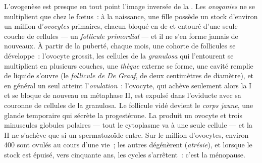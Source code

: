 \begin{definition}\label{def:b2:mammal-reproduction:ovary}
L'ovogenèse est presque en tout point l'image inversée de la
. Les \emph{ovogonies} ne se multiplient que chez le
fœtus~: à la naissance, une fille possède un stock d'environ un million
d'\emph{ovocytes} primaires, chacun bloqué en  de  et
entouré d'une seule couche de cellules --- un \emph{follicule
primordial} --- et il ne s'en forme jamais de nouveaux. À partir de la
puberté, chaque mois, une cohorte de follicules se développe~:
l'ovocyte grossit, les cellules de la \emph{granulosa} qui l'entourent
se multiplient en plusieurs couches, une \emph{thèque} externe se
forme, une cavité remplie de liquide s'ouvre (le \emph{follicule de De
Graaf}, de deux centimètres de diamètre), et en général un seul atteint
l'\emph{ovulation}~: l'ovocyte, qui achève seulement alors la  I et
se bloque de nouveau en métaphase II, est expulsé dans l'oviducte avec
sa couronne de cellules de la granulosa. Le follicule vidé devient le
\emph{corps jaune}, une glande temporaire qui sécrète la progestérone.
La  produit un ovocyte et trois minuscules globules polaires ---
tout le cytoplasme va à une seule cellule --- et la  II ne
s'achève que si un spermatozoïde entre. Sur le million d'ovocytes,
environ \num{400} sont ovulés au cours d'une vie~; les autres
dégénèrent (\emph{atrésie}), et lorsque le stock est épuisé, vers
cinquante ans, les cycles s'arrêtent~: c'est la ménopause.
\end{definition}

